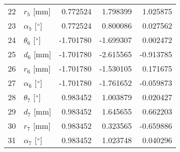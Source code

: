 \documentclass{standalone}%
\begin{document}
\begin{tabular}{llrrr}
22 &              $r_{5}$ [mm] &  0.772524 &   1.798399 &   1.025875 \\
23 &  $\alpha_{5}$ [$\degree$] &  0.772524 &   0.800086 &   0.027562 \\
24 &  $\theta_{6}$ [$\degree$] & -1.701780 &  -1.699307 &   0.002472 \\
25 &              $d_{6}$ [mm] & -1.701780 &  -2.615565 &  -0.913785 \\
26 &              $r_{6}$ [mm] & -1.701780 &  -1.530105 &   0.171675 \\
27 &  $\alpha_{6}$ [$\degree$] & -1.701780 &  -1.761652 &  -0.059873 \\
28 &  $\theta_{7}$ [$\degree$] &  0.983452 &   1.003879 &   0.020427 \\
29 &              $d_{7}$ [mm] &  0.983452 &   1.645655 &   0.662203 \\
30 &              $r_{7}$ [mm] &  0.983452 &   0.323565 &  -0.659886 \\
31 &  $\alpha_{7}$ [$\degree$] &  0.983452 &   1.023748 &   0.040296 \\
\bottomrule
\end{tabular}
%
\end{document}
